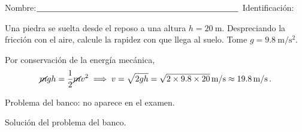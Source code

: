 \vspace*{-2cm}
Nombre:$\underline{\hspace{8.5cm}}$ Identificación: \hrulefill

\begin{exercise}[ID=ejemplo, subtitle={Caída libre}, tags={examen}, points=100]
Una piedra se suelta desde el reposo a una altura $h=\qty{20}{\m}$. Despreciando la fricción con el aire, calcule la rapidez con que llega al suelo. Tome $g=\qty{9.8}{\m/\s^2}$.

\vspace{4cm}
\end{exercise}
\begin{solution}
Por conservación de la energía mecánica,
\begin{align}
    \cancel{m}gh = \frac{1}{2}\cancel{m}v^2
    \;\Longrightarrow\;
    v = \sqrt{2gh} = \sqrt{2\times 9.8\times 20}\,\unit{\m/\s} \approx \qty{19.8}{\m/\s}\,.
\end{align}
\end{solution}

\begin{exercise}[ID=banco-ejemplo, tags={banco}]
Problema del banco: no aparece en el examen.
\end{exercise}
\begin{solution}
Solución del problema del banco.
\end{solution}


